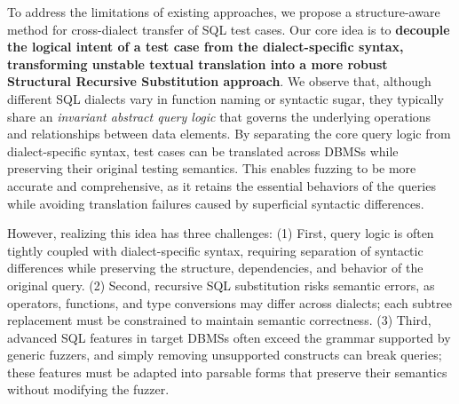 \documentclass[sigconf,review,anonymous]{acmart}
\begin{document}
To address the limitations of existing approaches, we propose a structure-aware method for cross-dialect transfer of SQL test cases. 
Our core idea is to \textbf{decouple the logical intent of a test case from the dialect-specific syntax, transforming unstable textual translation into a more robust Structural Recursive Substitution approach}.
We observe that, although different SQL dialects vary in function naming or syntactic sugar, they typically share an \textit{invariant abstract query logic} that governs the underlying operations and relationships between data elements.
By separating the core query logic from dialect-specific syntax, test cases can be translated across DBMSs while preserving their original testing semantics. 
This enables fuzzing to be more accurate and comprehensive, as it retains the essential behaviors of the queries while avoiding translation failures caused by superficial syntactic differences.

However, realizing this idea has three challenges:
(1) First, query logic is often tightly coupled with dialect-specific syntax, requiring separation of syntactic differences while preserving the structure, dependencies, and behavior of the original query. 
(2) Second, recursive SQL substitution risks semantic errors, as operators, functions, and type conversions may differ across dialects; each subtree replacement must be constrained to maintain semantic correctness. 
(3) Third, advanced SQL features in target DBMSs often exceed the grammar supported by generic fuzzers, and simply removing unsupported constructs can break queries; these features must be adapted into parsable forms that preserve their semantics without modifying the fuzzer.

\end{document}
